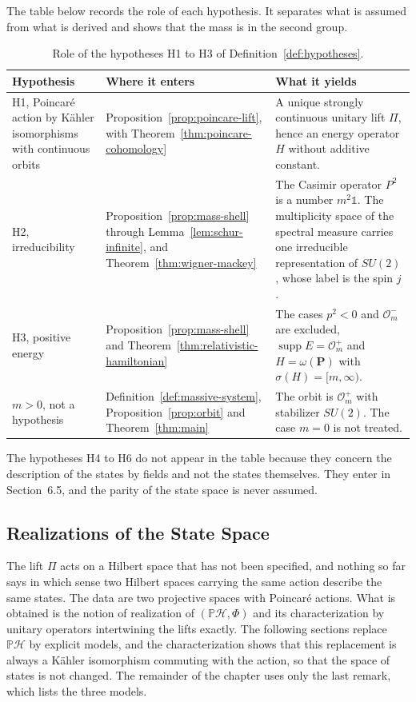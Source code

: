 The table below records the role of each hypothesis. It separates what is assumed from what is derived and shows that the mass is in the second group.

\begin{table}[ht]
	\centering
	\begin{tabular}{p{3.1cm}p{4.6cm}p{6.1cm}}
		\hline
		\textbf{Hypothesis} & \textbf{Where it enters} & \textbf{What it yields} \\
		\hline
		H1, Poincar\'e action by Kähler isomorphisms with continuous orbits
		& Proposition~\ref{prop:poincare-lift}, with Theorem~\ref{thm:poincare-cohomology}
		& A unique strongly continuous unitary lift $\Pi$, hence an energy operator $H$ without additive constant. \\
		H2, irreducibility
		& Proposition~\ref{prop:mass-shell} through Lemma~\ref{lem:schur-infinite}, and Theorem~\ref{thm:wigner-mackey}
		& The Casimir operator $P^2$ is a number $m^2\mathbb{1}$. The multiplicity space of the spectral measure carries one irreducible representation of $SU(2)$, whose label is the spin $j$. \\
		H3, positive energy
		& Proposition~\ref{prop:mass-shell} and Theorem~\ref{thm:relativistic-hamiltonian}
		& The cases $p^2<0$ and $\mathcal{O}_m^-$ are excluded, $\operatorname{supp}E=\mathcal{O}_m^+$ and $H=\omega(\mathbf{P})$ with $\sigma(H)=[m,\infty)$. \\
		$m>0$, not a hypothesis
		& Definition~\ref{def:massive-system}, Proposition~\ref{prop:orbit} and Theorem~\ref{thm:main}
		& The orbit is $\mathcal{O}_m^+$ with stabilizer $SU(2)$. The case $m=0$ is not treated. \\
		\hline
	\end{tabular}
	\caption{Role of the hypotheses H1 to H3 of Definition~\ref{def:hypotheses}.}
	\label{tab:hypotheses-roles}
\end{table}

The hypotheses H4 to H6 do not appear in the table because they concern the description of the states by fields and not the states themselves. They enter in Section~6.5, and the parity of the state space is never assumed.

\subsection{Realizations of the State Space}

The lift $\Pi$ acts on a Hilbert space that has not been specified, and nothing so far says in which sense two Hilbert spaces carrying the same action describe the same states. The data are two projective spaces with Poincar\'e actions. What is obtained is the notion of realization of $(\mathbb{P}\mathcal{H},\Phi)$ and its characterization by unitary operators intertwining the lifts exactly. The following sections replace $\mathbb{P}\mathcal{H}$ by explicit models, and the characterization shows that this replacement is always a Kähler isomorphism commuting with the action, so that the space of states is not changed. The remainder of the chapter uses only the last remark, which lists the three models.

